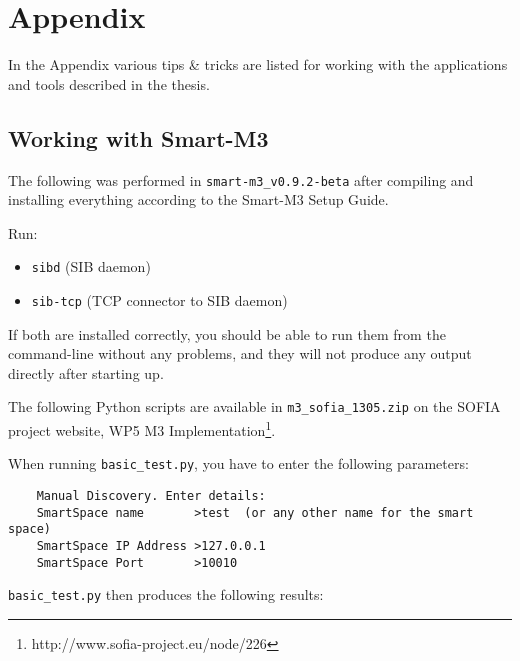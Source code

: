 \chapter{Appendix}

In the Appendix various tips \& tricks are listed for working with the applications and tools described in the thesis.

\section{Working with Smart-M3}

The following was performed in \texttt{smart-m3\_v0.9.2-beta} after compiling and installing everything according to the Smart-M3 Setup Guide.

Run:
\begin{itemize}
	\item \texttt{sibd} (SIB daemon)
	\item \texttt{sib-tcp} (TCP connector to SIB daemon)
\end{itemize}

If both are installed correctly, you should be able to run them from the command-line without any problems, and they will not produce any output directly after starting up.

The following Python scripts are available in \texttt{m3\_sofia\_1305.zip} on the SOFIA project website, WP5 M3 Implementation\footnote{http://www.sofia-project.eu/node/226}.

When running \texttt{basic\_test.py}, you have to enter the following parameters:

\begin{verbatim}
	Manual Discovery. Enter details:
	SmartSpace name       >test  (or any other name for the smart space)
	SmartSpace IP Address >127.0.0.1                          	
	SmartSpace Port       >10010
\end{verbatim}

\texttt{basic\_test.py} then produces the following results:

